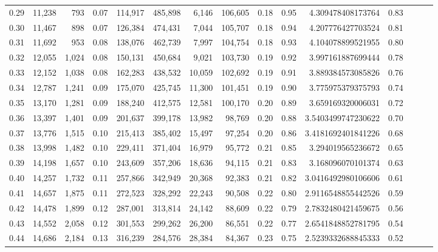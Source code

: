 \begin{tabular}{rrrrrrrrrrrrrrr}
0.29 &  11,238 &    793 &  0.07 &  114,917 &  485,898 &    6,146 &  106,605 &  0.18 &  0.95 &       4.309478408173764 &      0.83 \\
0.30 &  11,467 &    898 &  0.07 &  126,384 &  474,431 &    7,044 &  105,707 &  0.18 &  0.94 &       4.207776427703524 &      0.81 \\
0.31 &  11,692 &    953 &  0.08 &  138,076 &  462,739 &    7,997 &  104,754 &  0.18 &  0.93 &       4.104078899521955 &      0.80 \\
0.32 &  12,055 &  1,024 &  0.08 &  150,131 &  450,684 &    9,021 &  103,730 &  0.19 &  0.92 &       3.997161887699444 &      0.78 \\
0.33 &  12,152 &  1,038 &  0.08 &  162,283 &  438,532 &   10,059 &  102,692 &  0.19 &  0.91 &       3.889384573085826 &      0.76 \\
0.34 &  12,787 &  1,241 &  0.09 &  175,070 &  425,745 &   11,300 &  101,451 &  0.19 &  0.90 &       3.775975379375793 &      0.74 \\
0.35 &  13,170 &  1,281 &  0.09 &  188,240 &  412,575 &   12,581 &  100,170 &  0.20 &  0.89 &       3.659169320006031 &      0.72 \\
0.36 &  13,397 &  1,401 &  0.09 &  201,637 &  399,178 &   13,982 &   98,769 &  0.20 &  0.88 &      3.5403499747230622 &      0.70 \\
0.37 &  13,776 &  1,515 &  0.10 &  215,413 &  385,402 &   15,497 &   97,254 &  0.20 &  0.86 &      3.4181692401841226 &      0.68 \\
0.38 &  13,998 &  1,482 &  0.10 &  229,411 &  371,404 &   16,979 &   95,772 &  0.21 &  0.85 &       3.294019565236672 &      0.65 \\
0.39 &  14,198 &  1,657 &  0.10 &  243,609 &  357,206 &   18,636 &   94,115 &  0.21 &  0.83 &       3.168096070101374 &      0.63 \\
0.40 &  14,257 &  1,732 &  0.11 &  257,866 &  342,949 &   20,368 &   92,383 &  0.21 &  0.82 &      3.0416492980106606 &      0.61 \\
0.41 &  14,657 &  1,875 &  0.11 &  272,523 &  328,292 &   22,243 &   90,508 &  0.22 &  0.80 &      2.9116548855442526 &      0.59 \\
0.42 &  14,478 &  1,899 &  0.12 &  287,001 &  313,814 &   24,142 &   88,609 &  0.22 &  0.79 &      2.7832480421459675 &      0.56 \\
0.43 &  14,552 &  2,058 &  0.12 &  301,553 &  299,262 &   26,200 &   86,551 &  0.22 &  0.77 &      2.6541848852781795 &      0.54 \\
0.44 &  14,686 &  2,184 &  0.13 &  316,239 &  284,576 &   28,384 &   84,367 &  0.23 &  0.75 &      2.5239332688845333 &      0.52 \\

\end{tabular}
